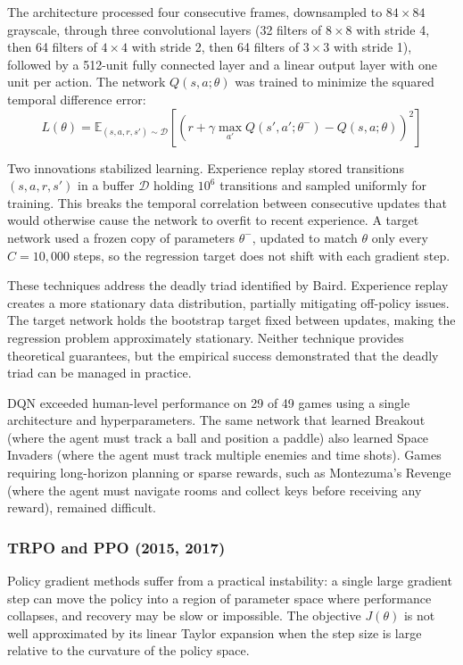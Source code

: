 The architecture processed four consecutive frames, downsampled to $84 \times 84$ grayscale, through three convolutional layers (32 filters of $8 \times 8$ with stride 4, then 64 filters of $4 \times 4$ with stride 2, then 64 filters of $3 \times 3$ with stride 1), followed by a 512-unit fully connected layer and a linear output layer with one unit per action. The network $Q(s, a; \theta)$ was trained to minimize the squared temporal difference error:
\begin{equation}
L(\theta) = \mathbb{E}_{(s,a,r,s') \sim \mathcal{D}} \left[ \left( r + \gamma \max_{a'} Q(s', a'; \theta^-) - Q(s, a; \theta) \right)^2 \right]
\end{equation}

Two innovations stabilized learning. Experience replay stored transitions $(s, a, r, s')$ in a buffer $\mathcal{D}$ holding $10^6$ transitions and sampled uniformly for training. This breaks the temporal correlation between consecutive updates that would otherwise cause the network to overfit to recent experience. A target network used a frozen copy of parameters $\theta^-$, updated to match $\theta$ only every $C = 10{,}000$ steps, so the regression target does not shift with each gradient step.

These techniques address the deadly triad identified by Baird. Experience replay creates a more stationary data distribution, partially mitigating off-policy issues. The target network holds the bootstrap target fixed between updates, making the regression problem approximately stationary. Neither technique provides theoretical guarantees, but the empirical success demonstrated that the deadly triad can be managed in practice.

DQN exceeded human-level performance on 29 of 49 games using a single architecture and hyperparameters. The same network that learned Breakout (where the agent must track a ball and position a paddle) also learned Space Invaders (where the agent must track multiple enemies and time shots). Games requiring long-horizon planning or sparse rewards, such as Montezuma's Revenge (where the agent must navigate rooms and collect keys before receiving any reward), remained difficult.

\subsubsection{TRPO and PPO (2015, 2017)}

Policy gradient methods suffer from a practical instability: a single large gradient step can move the policy into a region of parameter space where performance collapses, and recovery may be slow or impossible. The objective $J(\theta)$ is not well approximated by its linear Taylor expansion when the step size is large relative to the curvature of the policy space.

